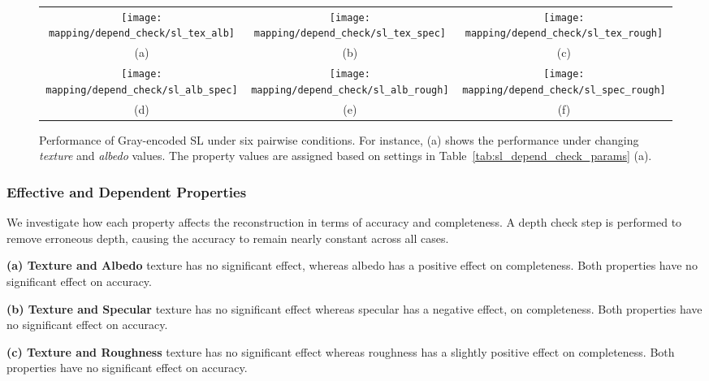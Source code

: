 \begin{sidewaysfigure}[!htbp]
\begin{tabular}{ccc}
\texttt{[image: mapping/depend\_check/sl\_tex\_alb]}&
\texttt{[image: mapping/depend\_check/sl\_tex\_spec]}&
\texttt{[image: mapping/depend\_check/sl\_tex\_rough]}\\
(a) & (b) & (c)\\
\texttt{[image: mapping/depend\_check/sl\_alb\_spec]}&
\texttt{[image: mapping/depend\_check/sl\_alb\_rough]}&
\texttt{[image: mapping/depend\_check/sl\_spec\_rough]}\\
(d) & (e) & (f)\\
\end{tabular}
\caption{Performance of Gray-encoded SL under six pairwise conditions. For instance, (a) shows the performance under changing \textit{texture} and \textit{albedo} values. The property values are assigned based on settings in Table~\ref{tab:sl_depend_check_params} (a).}
\label{fig:sl_depend_check}
\end{sidewaysfigure}

\subsubsection{Effective and Dependent Properties}
We investigate how each property affects the reconstruction in terms of accuracy and completeness. A depth check step is performed to remove erroneous depth, causing the accuracy to remain nearly constant across all cases.

\textbf{(a) Texture and Albedo} 
texture has no significant effect, whereas albedo has a positive effect on completeness. Both properties have no significant effect on accuracy.

\textbf{(b) Texture and Specular} 
texture has no significant effect whereas specular has a negative effect, on completeness. Both properties have no significant effect on accuracy.

\textbf{(c) Texture and Roughness} 
texture has no significant effect whereas roughness has a slightly positive effect on completeness. Both properties have no significant effect on accuracy.


